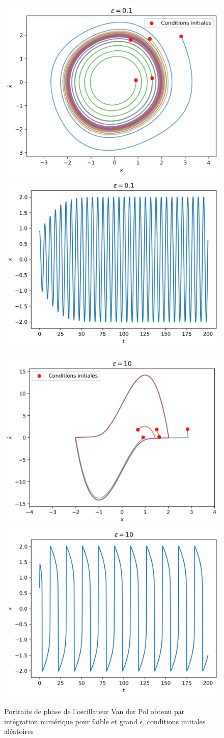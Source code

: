 \begin{figure}[t]
    \begin{subcaptionblock}{\linewidth}
        \includegraphics[width=.45\linewidth]{images/vdp/vanderpol_small.png}%
        \hfill
        \includegraphics[width=.45\linewidth]{images/vdp/vanderpol_small_x.png}%
    \end{subcaptionblock}
    \begin{subcaptionblock}{\linewidth}
        \includegraphics[width=.45\linewidth]{images/vdp/vanderpol_large.png}%
        \hfill
        \includegraphics[width=.45\linewidth]{images/vdp/vanderpol_large_x.png}%
    \end{subcaptionblock}
    \label{fig:portrait_vdp}
    \caption{Portraits de phase de l'oscillateur Van der Pol obtenu par intégration numérique pour faible et grand $\epsilon$, conditions initiales aléatoires}
\end{figure}


